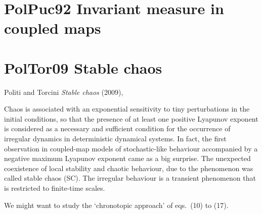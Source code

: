 \section{PolPuc92 Invariant measure in coupled maps}
\label{sect:PolPuc92}

\begin{description}

\end{description}

\section{PolTor09 Stable chaos}
\label{sect:PolTor09}

\begin{description}
\item
Politi and Torcini {\em Stable chaos} (2009),
\end{description}

Chaos is associated with an exponential sensitivity to tiny perturbations
in the initial conditions, so that the presence of at least one positive
Lyapunov exponent is considered as a necessary and sufficient condition
for the occurrence of irregular dynamics in deterministic dynamical
systems. In fact, the first observation in coupled-map models of
stochastic-like behaviour accompanied by a negative maximum Lyapunov
exponent came as a big surprise. %
The unexpected coexistence of local stability and chaotic behaviour, due
to the phenomenon was called stable chaos (SC). The irregular behaviour
is a transient phenomenon that is restricted to finite-time scales.

We might want to study the `chronotopic approach' of eqs.~(10) to (17).

\renewcommand{\ssp}{x}
\renewcommand{\Xx}{\ensuremath{\mathsf{X}}}      %
\renewcommand{\Laplacian}{\Delta}
\renewcommand\speriod[1]{{\ensuremath{\ell_{#1}}}}  %
\renewcommand\period[1]{{\ensuremath{\ell_{#1}}}}  %
\renewcommand{\Ssym}[1]{{\ensuremath{m_{#1}}}}    %

\printbibliography[heading=subbibintoc,title={References}]
